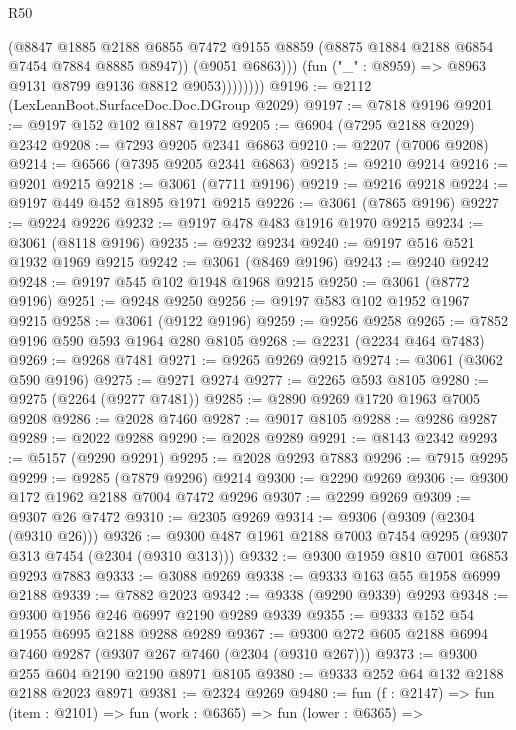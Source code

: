 \begin{lexlean}{R50}
\begin{coremodule}
                      (@8847
                        @1885
                        @2188
                        @6855
                        @7472
                        @9155
                        @8859
                        (@8875 @1884 @2188 @6854 @7454 @7884 @8885 @8947))
                      (@9051 @6863)))
                  (fun ("_" : @8959) => @8963 @9131 @8799 @9136 @8812 @9053))))))))
@9196 := @2112 (LexLeanBoot.SurfaceDoc.Doc.DGroup @2029)
@9197 := @7818 @9196
@9201 := @9197 @152 @102 @1887 @1972
@9205 := @6904 (@7295 @2188 @2029) @2342
@9208 := @7293 @9205 @2341 @6863
@9210 := @2207 (@7006 @9208)
@9214 := @6566 (@7395 @9205 @2341 @6863)
@9215 := @9210 @9214
@9216 := @9201 @9215
@9218 := @3061 (@7711 @9196)
@9219 := @9216 @9218
@9224 := @9197 @449 @452 @1895 @1971 @9215
@9226 := @3061 (@7865 @9196)
@9227 := @9224 @9226
@9232 := @9197 @478 @483 @1916 @1970 @9215
@9234 := @3061 (@8118 @9196)
@9235 := @9232 @9234
@9240 := @9197 @516 @521 @1932 @1969 @9215
@9242 := @3061 (@8469 @9196)
@9243 := @9240 @9242
@9248 := @9197 @545 @102 @1948 @1968 @9215
@9250 := @3061 (@8772 @9196)
@9251 := @9248 @9250
@9256 := @9197 @583 @102 @1952 @1967 @9215
@9258 := @3061 (@9122 @9196)
@9259 := @9256 @9258
@9265 := @7852 @9196 @590 @593 @1964 @280 @8105
@9268 := @2231 (@2234 @464 @7483)
@9269 := @9268 @7481
@9271 := @9265 @9269 @9215
@9274 := @3061 (@3062 @590 @9196)
@9275 := @9271 @9274
@9277 := @2265 @593 @8105
@9280 := @9275 (@2264 (@9277 @7481))
@9285 := @2890 @9269 @1720 @1963 @7005 @9208
@9286 := @2028 @7460
@9287 := @9017 @8105
@9288 := @9286 @9287
@9289 := @2022 @9288
@9290 := @2028 @9289
@9291 := @8143 @2342
@9293 := @5157 (@9290 @9291)
@9295 := @2028 @9293 @7883
@9296 := @7915 @9295
@9299 := @9285 (@7879 @9296) @9214
@9300 := @2290 @9269
@9306 := @9300 @172 @1962 @2188 @7004 @7472 @9296
@9307 := @2299 @9269
@9309 := @9307 @26 @7472
@9310 := @2305 @9269
@9314 := @9306 (@9309 (@2304 (@9310 @26)))
@9326 := @9300 @487 @1961 @2188 @7003 @7454 @9295 (@9307 @313 @7454 (@2304 (@9310 @313)))
@9332 := @9300 @1959 @810 @7001 @6853 @9293 @7883
@9333 := @3088 @9269
@9338 := @9333 @163 @55 @1958 @6999 @2188
@9339 := @7882 @2023
@9342 := @9338 (@9290 @9339) @9293
@9348 := @9300 @1956 @246 @6997 @2190 @9289 @9339
@9355 := @9333 @152 @54 @1955 @6995 @2188 @9288 @9289
@9367 := @9300 @272 @605 @2188 @6994 @7460 @9287 (@9307 @267 @7460 (@2304 (@9310 @267)))
@9373 := @9300 @255 @604 @2190 @2190 @8971 @8105
@9380 := @9333 @252 @64 @132 @2188 @2188 @2023 @8971
@9381 := @2324 @9269
@9480 := fun (f : @2147) =>
  fun (item : @2101) =>
  fun (work : @6365) =>
  fun (lower : @6365) =>

\end{coremodule}
\end{lexlean}
